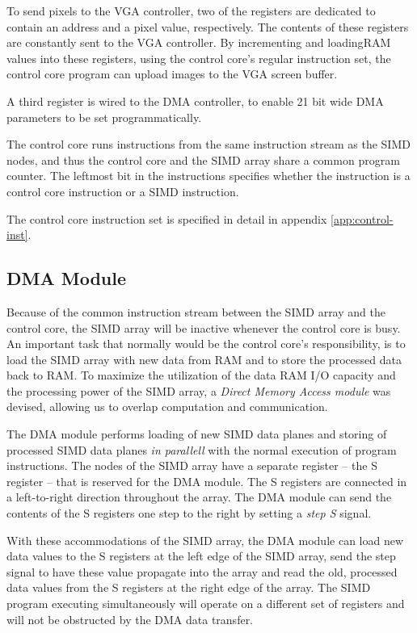 
To send pixels to the \ac{VGA} controller, two of the registers are dedicated to
contain an address and a pixel value, respectively. The contents of these
registers are constantly sent to the \ac{VGA} controller. By incrementing and
loading\ac{RAM} values into these registers, using the control core's regular
instruction set, the control core program can upload images to the \ac{VGA}
screen buffer.

A third register is wired to the \ac{DMA} controller, to enable 21 bit wide
\ac{DMA} parameters to be set programmatically.

The control core runs instructions from the same instruction stream as the
\ac{SIMD} nodes, and thus the control core and the \ac{SIMD} array share a
common program counter. The leftmost bit in the instructions specifies whether
the instruction is a control core instruction or a \ac{SIMD} instruction.

The control core instruction set is specified in detail in appendix
\ref{app:control-inst}.

\subsection{DMA Module}

Because of the common instruction stream between the \ac{SIMD} array and the
control core, the \ac{SIMD} array will be inactive whenever the control core is
busy. An important task that normally would be the control core's
responsibility, is to load the \ac{SIMD} array with new data from \ac{RAM} and
to store the processed data back to \ac{RAM}. To maximize the utilization of the
data \ac{RAM} \ac{I/O} capacity and the processing power of the \ac{SIMD} array,
a \emph{Direct Memory Access module} was devised, allowing us to overlap computation
and communication.

The \ac{DMA} module performs loading of new \ac{SIMD} data planes and storing of
processed \ac{SIMD} data planes \emph{in parallell} with the normal execution
of program instructions. The nodes of the \ac{SIMD} array have a separate
register -- the S register -- that is reserved for the \ac{DMA} module. The S
registers are connected in a left-to-right direction throughout the
array. The \ac{DMA} module can send the contents of the S registers one step
to the right by setting a \emph{step S} signal.

With these accommodations of the \ac{SIMD} array, the \ac{DMA} module can load
new data values to the S registers at the left edge of the \ac{SIMD} array, send
the step signal to have these value propagate into the array and read the old,
processed data values from the S registers at the right edge of the array. The
\ac{SIMD} program executing simultaneously will operate on a different set of
registers and will not be obstructed by the \ac{DMA} data transfer.

